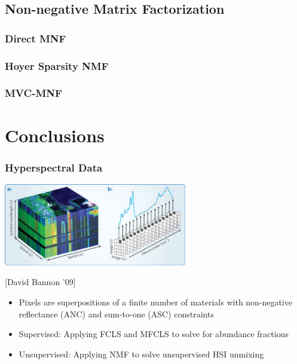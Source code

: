 \documentclass{beamer}
\begin{document}
\subsection{Non-negative Matrix Factorization}
    \subsubsection{Direct MNF}
    \subsubsection{Hoyer Sparsity NMF}
    \subsubsection{MVC-MNF}
\section{Conclusions}


\begin{frame}
\frametitle{Hyperspectral Data}
\vspace*{-0.7cm}
\includegraphics[width=8cm,center]{him}

[David Bannon '09]

\begin{itemize}
\item Pixels are superpositions of a finite number of materials with non-negative reflectance (ANC) and sum-to-one (ASC) constraints
\item Supervised: Applying FCLS and MFCLS to solve for abundance fractions
\item Unsupervised: Applying NMF to solve unsupervised HSI unmixing
\end{itemize}
\end{frame}
\end{document}
